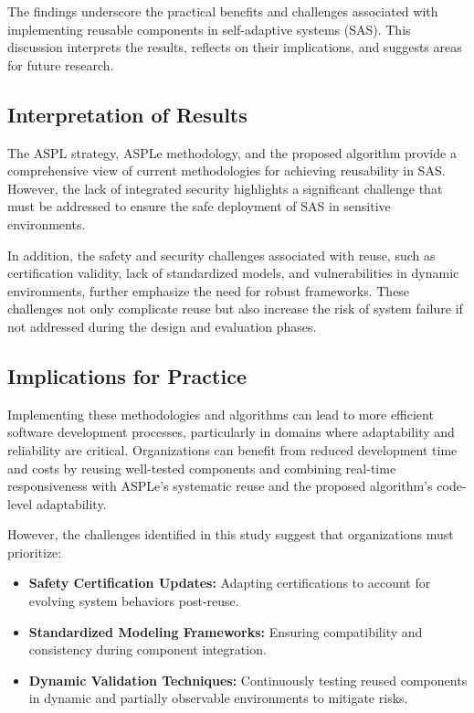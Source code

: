 \documentclass[a4paper,10pt]{article}
\begin{document}
The findings underscore the practical benefits and challenges associated with implementing reusable components in self-adaptive systems (SAS). This discussion interprets the results, reflects on their implications, and suggests areas for future research.

\subsection{Interpretation of Results}

The ASPL strategy, ASPLe methodology, and the proposed algorithm provide a comprehensive view of current methodologies for achieving reusability in SAS. However, the lack of integrated security highlights a significant challenge that must be addressed to ensure the safe deployment of SAS in sensitive environments.

In addition, the safety and security challenges associated with reuse, such as certification validity, lack of standardized models, and vulnerabilities in dynamic environments, further emphasize the need for robust frameworks. These challenges not only complicate reuse but also increase the risk of system failure if not addressed during the design and evaluation phases.

\subsection{Implications for Practice}

Implementing these methodologies and algorithms can lead to more efficient software development processes, particularly in domains where adaptability and reliability are critical. Organizations can benefit from reduced development time and costs by reusing well-tested components and combining real-time responsiveness with ASPLe’s systematic reuse and the proposed algorithm’s code-level adaptability.

However, the challenges identified in this study suggest that organizations must prioritize:
\begin{itemize}
    \item \textbf{Safety Certification Updates:} Adapting certifications to account for evolving system behaviors post-reuse.
    \item \textbf{Standardized Modeling Frameworks:} Ensuring compatibility and consistency during component integration.
    \item \textbf{Dynamic Validation Techniques:} Continuously testing reused components in dynamic and partially observable environments to mitigate risks.
\end{itemize}
\end{document}
